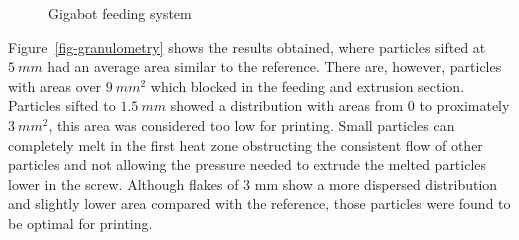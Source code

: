 \documentclass[
  12pt,
]{article}
\begin{document}
\begin{figure}
\begin{minipage}[t]{0.40\linewidth}
{\centering 


\caption{\label{fig-crammer}Gigabot feeding system}

}

\end{minipage}%

\end{figure}

Figure~\ref{fig-granulometry} shows the results obtained, where
particles sifted at \(5~mm\) had an average area similar to the
reference. There are, however, particles with areas over \(9~mm^{2}\)
which blocked in the feeding and extrusion section. Particles sifted to
\(1.5~mm\) showed a distribution with areas from 0 to proximately
\(3~mm^{2}\), this area was considered too low for printing. Small
particles can completely melt in the first heat zone obstructing the
consistent flow of other particles and not allowing the pressure needed
to extrude the melted particles lower in the screw. Although flakes of 3
mm show a more dispersed distribution and slightly lower area compared
with the reference, those particles were found to be optimal for
printing.
\end{document}
